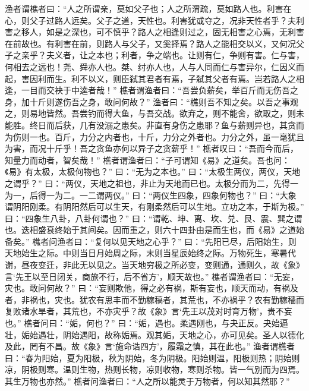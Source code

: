 \documentclass[12pt,UTF8]{ctexbook}
\begin{document}
渔者谓樵者曰：“人之所谓亲，莫如父子也；人之所渭疏，莫如路人也。利害在心，则父子过路人远矣。父子之道，天性也。利害犹或夺之，况非天性者乎？夫利害之移人，如是之深也，可不慎乎？路人之相逢则过之，固无相害之心焉，无利害在前故也。有利害在前，则路人与父子，又奚择焉？路人之能相交以义，又何况父子之亲乎？夫义者，让之本也；利者，争之端也。让则有仁，争则有害。仁与害，何相去之远也！尧、舜亦人也。桀、纣亦人也，人与人同而仁与害异尔，仁因义而起，害因利而生。利不以义，则臣弑其君者有焉，子弑其父者有焉。岂若路人之相逢，一目而交袂于中逵者哉！”
樵者谓渔者曰：“吾尝负薪矣，举百斤而无伤吾之身，加十斤则遂伤吾之身，敢问何故？”
渔者曰：“樵则吾不知之矣。以吾之事观之，则易地皆然。吾尝钓而得大鱼，与吾交战。欲弃之，则不能舍，欲取之，则未能胜。终日而后获，几有没溺之患矣。非直有身伤之患耶？鱼与薪则异也，其贪而为伤则一也。百斤，力分之内者也，十斤，力分之外者也。力分之外，虽一毫犹且为害，而况十斤乎！吾之贪鱼亦何以异子之贪薪乎！”
樵者叹曰：“吾而今而后，知量力而动者，智矣哉！”
樵者谓渔者曰：“子可谓知《易》之道矣。吾也问：《易》有太极，太极何物也？”
曰：“无为之本也。”
曰：“太极生两仪，两仪，天地之谓乎？”
曰：“两仪，天地之祖也，非止为天地而已也。太极分而为二，先得一为一，后得一为二。一二谓两仪。”
曰：“两仪生四象，四象何物也？”
曰：“大象谓阴阳刚柔。有阴阳然后可以生天，有刚柔然后可以生地。立功之本，于斯为极。”
曰：“四象生八卦，八卦何谓也？”
曰：“谓乾、坤、离、坎、兑、艮、震、巽之谓也。迭相盛衰终始于其间矣。因而重之，则六十四卦由是而生也，而《易》之道始备矣。”
樵者问渔者曰：“复何以见天地之心乎？”
曰：“先阳已尽，后阳始生，则天地始生之际。中则当日月始周之际，末则当星辰始终之际。万物死生，寒暑代谢，昼夜变迁，非此无以见之。当天地穷极之所必变，变则通，通则久，故《象》言‘先王以至日闭关，商旅不行，后不省方’，顺天故也。”
樵者谓渔者曰：“无妄，灾也。敢问何故？”
曰：“妄则欺他，得之必有祸，斯有妄也，顺天而动，有祸及者，非祸也，灾也。犹农有思丰而不勤稼稿者，其荒也，不亦祸乎？农有勤稼穑而复败诸水旱者，其荒也，不亦灾乎？故《象》言‘先王以茂对时育万物’，贵不妄也。”
樵者问曰：“姤，何也？”
曰：“姤，遇也。柔遇刚也，与夬正反。夬始逼壮，姤始遇壮，阴始遇阳，故称姤焉。观其姤，天地之心，亦可见矣。圣人以德化及此，罔有不昌。故《象》言‘施命诰四方’，履霜之慎，其在此也。”
渔者谓樵者曰：“春为阳始，夏为阳极，秋为阴始，冬为阴极。阳始则温，阳极则热；阴始则凉，阴极则寒。温则生物，热则长物，凉则收物，寒则杀物。皆一气别而为四焉。其生万物也亦然。”
樵者问渔者曰：“人之所以能灵于万物者，何以知其然耶？”
\end{document}
